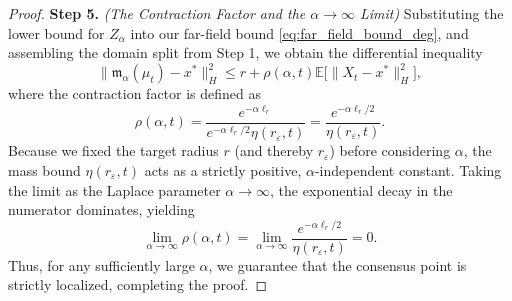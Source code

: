 \documentclass[12pt]{amsart}
\numberwithin{equation}{section}
\begin{document}
\begin{proof}
\textbf{Step 5.} \textit{(The Contraction Factor and the $\alpha \to \infty$ Limit)} 
Substituting the lower bound for $Z_\alpha$ into our far-field bound \eqref{eq:far_field_bound_deg}, and assembling the domain split from Step 1, we obtain the differential inequality
\begin{equation*}
    \|\mathfrak{m}_{\alpha}(\mu_t) - x^*\|_H^2 \leq r + \rho(\alpha, t) \mathbb{E}\big[\|X_t - x^*\|_H^2\big],
\end{equation*}
where the contraction factor is defined as 
\begin{equation*}
    \rho(\alpha, t) = \frac{e^{-\alpha \ell_r}}{e^{-\alpha \ell_r / 2} \eta(r_\varepsilon, t)} = \frac{e^{-\alpha \ell_r / 2}}{\eta(r_\varepsilon, t)}.
\end{equation*}
Because we fixed the target radius $r$ (and thereby $r_\varepsilon$) before considering $\alpha$, the mass bound $\eta(r_\varepsilon, t)$ acts as a strictly positive, $\alpha$-independent constant. Taking the limit as the Laplace parameter $\alpha \to \infty$, the exponential decay in the numerator dominates, yielding
\begin{equation*}
    \lim_{\alpha \to \infty} \rho(\alpha, t) = \lim_{\alpha \to \infty} \frac{e^{-\alpha \ell_r / 2}}{\eta(r_\varepsilon, t)} = 0.
\end{equation*}
Thus, for any sufficiently large $\alpha$, we guarantee that the consensus point is strictly localized, completing the proof. 
\end{proof}
\end{document}
